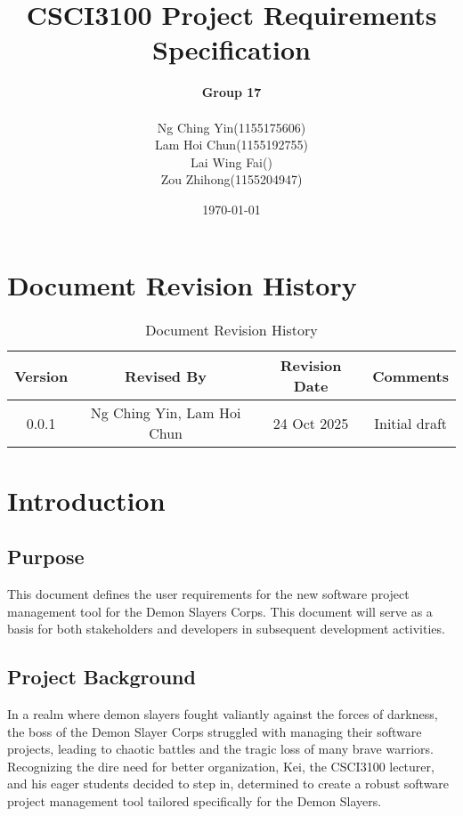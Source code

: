 \documentclass[11pt]{article}
\title{CSCI3100 Project Requirements Specification}
\author{
    \textbf{Group 17} \\[1em]
    \begin{tabular}{ll}
        Ng Ching Yin & (1155175606) \\
        Lam Hoi Chun & (1155192755) \\
        Lai Wing Fai & () \\
        Zou Zhihong & (1155204947)
    \end{tabular}
}
\date{\today}
\begin{document}
\maketitle

{
    \hypersetup{linkcolor=black}
    \tableofcontents
}

\newpage

\section{Document Revision History}
\begin{table}[h]
    \centering
    \caption{Document Revision History}
    \begin{tabular}{cccc}
        \toprule
        Version & Revised By & Revision Date & Comments \\
        \midrule
        0.0.1 & Ng Ching Yin, Lam Hoi Chun & 24 Oct 2025 & Initial draft \\
        \bottomrule
    \end{tabular}
    \label{tab:docs_rev_hist}
\end{table}

\section{Introduction}

\subsection{Purpose}

This document defines the user requirements for the new software project management
tool for the Demon Slayers Corps. This document will serve as a basis for both
stakeholders and developers in subsequent development activities.

\subsection{Project Background}

In a realm where demon slayers fought valiantly against the forces of darkness, the boss of
the Demon Slayer Corps struggled with managing their software projects, leading to chaotic
battles and the tragic loss of many brave warriors. Recognizing the dire need for better
organization, Kei, the CSCI3100 lecturer, and his eager students decided to step in, determined
to create a robust software project management tool tailored specifically for the Demon Slayers.
\end{document}
